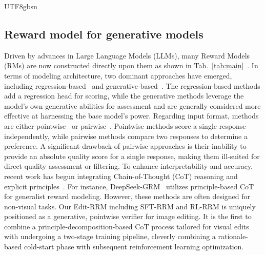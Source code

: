 \documentclass{llmxive}
\begin{document}
\begin{CJK*}{UTF8}{gbsn}
\subsection{Reward model for generative models}
Driven by advances in Large Language Models (LLMs), many Reward Models (RMs) are now constructed directly upon them as shown in Tab.~\ref{tab:main}~\citep{ren2024byteedit,wu2025rewarddance,gong2025seedream,ma2025hpsv3}. 
In terms of modeling architecture, two dominant approaches have emerged, including regression-based~\citep{liu2025improving, wang2025worldpm} and generative-based~\citep{wu2025rewarddance,gong2025onereward,hong2025think}. The regression-based methods add a regression head for scoring, while the generative methods leverage the model's own generative abilities for assessment and are generally considered more effective at harnessing the base model's power. 
Regarding input format, methods are either pointwise~\citep{wu2025visualquality,wei2025skywork} or pairwise~\citep{wang2025unified, wu2025rewarddance}. Pointwise methods score a single response independently, while pairwise methods compare two responses to determine a preference. 
A significant drawback of pairwise approaches is their inability to provide an absolute quality score for a single response, making them ill-suited for direct quality assessment or filtering.
To enhance interpretability and accuracy, recent work has begun integrating Chain-of-Thought (CoT) reasoning and explicit principles~\citep{liu2025inference, wang2025unified}. For instance, DeepSeek-GRM~\citep{liu2025inference} utilizes principle-based CoT for generalist reward modeling. However, these methods are often designed for non-visual tasks. 
Our Edit-RRM including SFT-RRM and RL-RRM is uniquely positioned as a generative, pointwise verifier for image editing. It is the first to combine a principle-decomposition-based CoT process tailored for visual edits with undergoing a two-stage training pipeline, cleverly combining a rationale-based cold-start phase with subsequent reinforcement learning optimization.




\end{CJK*}
\end{document}
